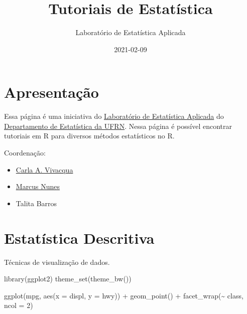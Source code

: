 \documentclass[
]{book}
\title{Tutoriais de Estatística}
\author{Laboratório de Estatística Aplicada}
\date{2021-02-09}
\newenvironment{Shaded}{\begin{snugshade}}{\end{snugshade}}
\newcommand{\AttributeTok}[1]{\textcolor[rgb]{0.77,0.63,0.00}{#1}}
\newcommand{\DecValTok}[1]{\textcolor[rgb]{0.00,0.00,0.81}{#1}}
\newcommand{\FunctionTok}[1]{\textcolor[rgb]{0.00,0.00,0.00}{#1}}
\newcommand{\NormalTok}[1]{#1}
\newcommand{\SpecialCharTok}[1]{\textcolor[rgb]{0.00,0.00,0.00}{#1}}
\providecommand{\tightlist}{%
  \setlength{\itemsep}{0pt}\setlength{\parskip}{0pt}}
\begin{document}
\maketitle

{
\setcounter{tocdepth}{1}
\tableofcontents
}
\hypertarget{apresentacao}{%
\chapter*{Apresentação}\label{apresentacao}}

Essa página é uma iniciativa do \href{lea.estatistica.ccet.ufrn.br/}{Laboratório de Estatística Aplicada} do \href{https://sigaa.ufrn.br/sigaa/public/departamento/portal.jsf?id=47}{Departamento de Estatística da UFRN}. Nessa página é possível encontrar tutoriais em R para diversos métodos estatísticos no R.

Coordenação:

\begin{itemize}
\tightlist
\item
  \href{https://sigaa.ufrn.br/sigaa/public/docente/portal.jsf?siape=1218831}{Carla A. Vivacqua}
\item
  \href{https://marcusnunes.me}{Marcus Nunes}
\item
  Talita Barros
\end{itemize}

\hypertarget{estatisticadescritiva}{%
\chapter*{Estatística Descritiva}\label{estatisticadescritiva}}

Técnicas de visualização de dados.

\begin{Shaded}
\begin{Highlighting}[]
\FunctionTok{library}\NormalTok{(ggplot2)}
\FunctionTok{theme\_set}\NormalTok{(}\FunctionTok{theme\_bw}\NormalTok{())}

\FunctionTok{ggplot}\NormalTok{(mpg, }\FunctionTok{aes}\NormalTok{(}\AttributeTok{x =}\NormalTok{ displ, }\AttributeTok{y =}\NormalTok{ hwy)) }\SpecialCharTok{+}
  \FunctionTok{geom\_point}\NormalTok{() }\SpecialCharTok{+}
  \FunctionTok{facet\_wrap}\NormalTok{(}\SpecialCharTok{\textasciitilde{}}\NormalTok{ class, }\AttributeTok{ncol =} \DecValTok{2}\NormalTok{)}
\end{Highlighting}
\end{Shaded}
\end{document}
